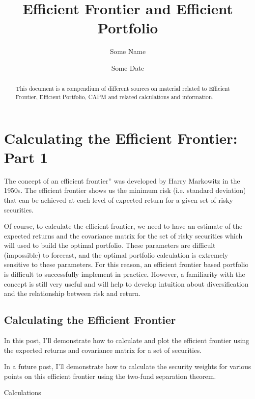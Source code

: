 \documentclass[12pt,a4paper]{article}
\begin{document}
\title{Ef{}f{}icient Frontier and Ef{}f{}icient Portfolio}
\author{Some Name}
\date{Some Date}
\maketitle

\newpage

\tableofcontents

\begin{abstract}
This document is a compendium of different sources on material related to Efficient Frontier, Efficient Portfolio, CAPM and related calculations and information.
\end{abstract}

\section{Calculating the Efficient Frontier: Part 1}

The concept of  an efficient frontier” was developed by Harry Markowitz in the 1950s.  The efficient frontier shows us the minimum risk (i.e. standard deviation) that can be achieved at each level of expected return for a given set of risky securities.

Of course, to calculate the efficient frontier, we need to have an estimate of the expected returns and the covariance matrix for the set of risky securities which will used to build the optimal portfolio.  These parameters are difficult (impossible) to forecast, and the optimal portfolio calculation is extremely sensitive to these parameters.  For this reason, an efficient frontier based portfolio is difficult to successfully implement in practice.  However, a familiarity with the concept is still very useful and will help to develop intuition about diversification and the relationship between risk and return.

\subsection{Calculating the Efficient Frontier}

In this post, I’ll demonstrate how to calculate and plot the efficient frontier using the expected returns and covariance matrix for a set of securities.

In a future post, I’ll demonstrate how to calculate the security weights for various points on this efficient frontier using the two-fund separation theorem.

Calculations
\end{document}
